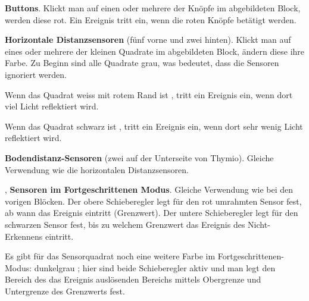 \label{a.blocks}


 \textbf{Buttons}. Klickt man auf einen oder mehrere der Knöpfe im abgebildeten Block, werden diese rot. Ein Ereignis tritt ein, wenn die roten Knöpfe betätigt werden. 

\bigskip\bigskip


 \textbf{Horizontale Distanzsensoren} (fünf vorne und zwei hinten). Klickt man auf eines oder mehrere der kleinen Quadrate im abgebildeten Block, ändern diese ihre Farbe. Zu Beginn sind alle Quadrate grau, was bedeutet, dass die Sensoren ignoriert werden. 

Wenn das Quadrat weiss mit rotem Rand ist , tritt ein Ereignis ein, wenn dort viel Licht reflektiert wird. 

Wenn das Quadrat schwarz ist , tritt ein Ereignis ein, wenn dort sehr wenig Licht reflektiert wird. 

\bigskip


\bigskip

 \textbf{Bodendistanz-Sensoren} (zwei auf der Unterseite von 
Thymio). Gleiche Verwendung wie die horizontalen Distanzsensoren.

\bigskip\bigskip

, 
\textbf{Sensoren im Fortgeschrittenen Modus}. Gleiche Verwendung wie bei den vorigen Blöcken. Der obere Schieberegler legt für den rot umrahmten Sensor fest, ab wann das Ereignis eintritt (Grenzwert). Der untere Schieberegler legt für den schwarzen Sensor fest, bis zu welchem Grenzwert das Ereignis des Nicht-Erkennens eintritt.  

\bigskip\bigskip

Es gibt für das Sensorquadrat noch eine weitere Farbe im Fortgeschrittenen-Modus: dunkelgrau ; hier sind beide Schieberegler aktiv und man legt den Bereich des das Ereignis auslösenden Bereichs mittels Obergrenze und Untergrenze des Grenzwerts fest. 

